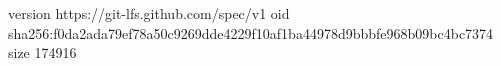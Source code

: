 version https://git-lfs.github.com/spec/v1
oid sha256:f0da2ada79ef78a50c9269dde4229f10af1ba44978d9bbbfe968b09bc4bc7374
size 174916
